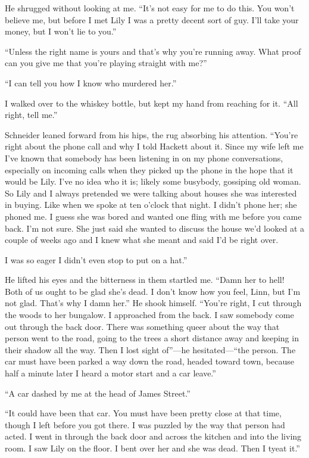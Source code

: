 \documentclass{novel}
\begin{document}
{He shrugged without looking at me. “It’s not easy for me to do this. You won’t believe me, but before I met Lily I was a pretty decent sort of guy. I’ll take your money, but I won’t lie to you.”

“Unless the right name is yours and that’s why you’re running away. What proof can you give me that you’re playing straight with me?”

“I can tell you how I know who murdered her.”

I walked over to the whiskey bottle, but kept my hand from reaching for it. “All right, tell me.”

Schneider leaned forward from his hips, the rug absorbing his attention. “You’re right about the phone call and why I told Hackett about it. Since my wife left me I’ve known that somebody has been listening in on my phone conversations, especially on incoming calls when they picked up the phone in the hope that it would be Lily. I’ve no idea who it is; likely some busybody, gossiping old woman. So Lily and I always pretended we were talking about houses she was interested in buying. Like when we spoke at ten o’clock that night. I didn’t phone her; she phoned me. I guess she was bored and wanted one fling with me before you came back. I’m not sure. She just said she wanted to discuss the house we’d looked at a couple of weeks ago and I knew what she meant and said I’d be right over.

I was so eager I didn’t even stop to put on a hat.”

He lifted his eyes and the bitterness in them startled me. “Damn her to hell! Both of us ought to be glad she’s dead. I don’t know how you feel, Linn, but I’m not glad. That’s why I damn her.” He shook himself. “You’re right, I cut through the woods to her bungalow. I approached from the back. I saw somebody come out through the back door. There was something queer about the way that person went to the road, going to the trees a short distance away and keeping in their shadow all the way. Then I lost sight of”—he hesitated—“the person. The car must have been parked a way down the road, headed toward town, because half a minute later I heard a motor start and a car leave.”

“A car dashed by me at the head of James Street.”

“It could have been that car. You must have been pretty close at that time, though I left before you got there. I was puzzled by the way that person had acted. I went in through the back door and across the kitchen and into the living room. I saw Lily on the floor. I bent over her and she was dead. Then I tyeat it.”

}
\end{document}
